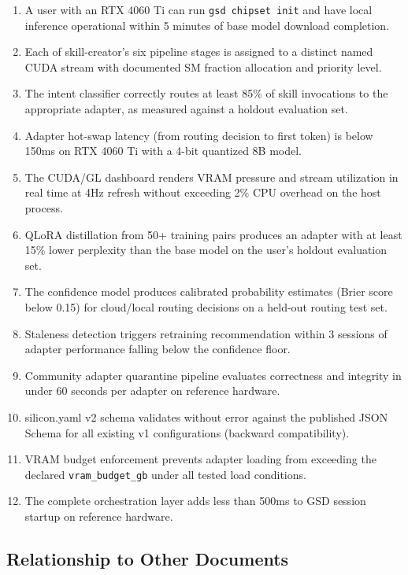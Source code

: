 \documentclass[11pt,letterpaper]{article}
\begin{document}
\begin{enumerate}[leftmargin=*, label=\textbf{SC-\arabic*.}]
  \item A user with an RTX 4060 Ti can run \texttt{gsd chipset init} and have local inference operational within 5 minutes of base model download completion.
  \item Each of skill-creator's six pipeline stages is assigned to a distinct named CUDA stream with documented SM fraction allocation and priority level.
  \item The intent classifier correctly routes at least 85\% of skill invocations to the appropriate adapter, as measured against a holdout evaluation set.
  \item Adapter hot-swap latency (from routing decision to first token) is below 150ms on RTX 4060 Ti with a 4-bit quantized 8B model.
  \item The CUDA/GL dashboard renders VRAM pressure and stream utilization in real time at 4Hz refresh without exceeding 2\% CPU overhead on the host process.
  \item QLoRA distillation from 50+ training pairs produces an adapter with at least 15\% lower perplexity than the base model on the user's holdout evaluation set.
  \item The confidence model produces calibrated probability estimates (Brier score below 0.15) for cloud/local routing decisions on a held-out routing test set.
  \item Staleness detection triggers retraining recommendation within 3 sessions of adapter performance falling below the confidence floor.
  \item Community adapter quarantine pipeline evaluates correctness and integrity in under 60 seconds per adapter on reference hardware.
  \item silicon.yaml v2 schema validates without error against the published JSON Schema for all existing v1 configurations (backward compatibility).
  \item VRAM budget enforcement prevents adapter loading from exceeding the declared \texttt{vram\_budget\_gb} under all tested load conditions.
  \item The complete orchestration layer adds less than 500ms to GSD session startup on reference hardware.
\end{enumerate}

\subsection{Relationship to Other Documents}
\end{document}
